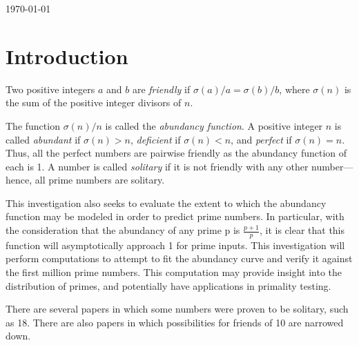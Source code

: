 \documentclass[11pt]{article}
\begin{document}
\begin{titlepage}
{\large \today}\\[3cm] 


 

\vfill 

\end{titlepage}

\tableofcontents
\newpage
\newpage

\section{Introduction}
\begin{dfn}
Two positive integers $a$ and $b$ are \textit{friendly} if $\sigma(a)/a = \sigma(b)/b$, where $\sigma(n)$ is the sum of the positive integer divisors of $n$.
\end{dfn}

The function $\sigma(n)/n$ is called the \textit{abundancy function}. A positive integer $n$ is called \textit{abundant} if $\sigma(n) > n$, \textit{deficient} if $\sigma(n) < n$, and \textit{perfect} if $\sigma(n) = n$. Thus, all the perfect numbers are pairwise friendly as the abundancy function of each is 1. A number is called \textit{solitary} if it is not friendly with any other number---hence, all prime numbers are solitary.

This investigation also seeks to evaluate the extent to which the abundancy function may be modeled in order to predict prime numbers. In particular, with the consideration that the abundancy of any prime p is $\frac{p+1}{p}$, it is clear that this function will asymptotically approach 1 for prime inputs. This investigation will perform computations to attempt to fit the abundancy curve and verify it against the first million prime numbers. This computation may provide insight into the distribution of primes, and potentially have applications in primality testing.

There are several papers in which some numbers were proven to be solitary, such as 18. There are also papers in which possibilities for friends of 10 are narrowed down.
$ $ \indent 
\end{document}
